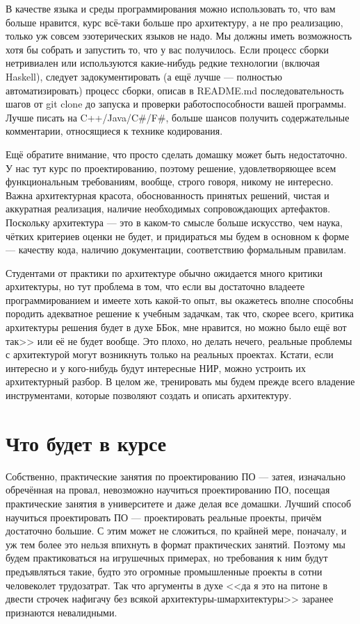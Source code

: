 \documentclass[a5paper]{article}
\begin{document}
В качестве языка и среды программирования можно использовать то, что вам больше нравится, курс всё-таки больше про архитектуру, а не про реализацию, только уж совсем эзотерических языков не надо. Мы должны иметь возможность хотя бы собрать и запустить то, что у вас получилось. Если процесс сборки нетривиален или используются какие-нибудь редкие технологии (включая Haskell), следует задокументировать (а ещё лучше --- полностью автоматизировать) процесс сборки, описав в README.md последовательность шагов от git clone до запуска и проверки работоспособности вашей программы. Лучше писать на C++/Java/C\#/F\#, больше шансов получить содержательные комментарии, относящиеся к технике кодирования.

Ещё обратите внимание, что просто сделать домашку может быть недостаточно. У нас тут курс по проектированию, поэтому решение, удовлетворяющее всем функциональным требованиям, вообще, строго говоря, никому не интересно. Важна архитектурная красота, обоснованность принятых решений, чистая и аккуратная реализация, наличие необходимых сопровождающих артефактов. Поскольку архитектура --- это в каком-то смысле больше искусство, чем наука, чётких критериев оценки не будет, и придираться мы будем в основном к форме --- качеству кода, наличию документации, соответствию формальным правилам.

Студентами от практики по архитектуре обычно ожидается много критики архитектуры, но тут проблема в том, что если вы достаточно владеете программированием и имеете хоть какой-то опыт, вы окажетесь вполне способны породить адекватное решение к учебным задачкам, так что, скорее всего, критика архитектуры решения будет в духе ББок, мне нравится, но можно было ещё вот так>> или её не будет вообще. Это плохо, но делать нечего, реальные проблемы с архитектурой могут возникнуть только на реальных проектах. Кстати, если интересно и у кого-нибудь будут интересные НИР, можно устроить их архитектурный разбор. В целом же, тренировать мы будем прежде всего владение инструментами, которые позволяют создать и описать архитектуру.

\section{Что будет в курсе}

Собственно, практические занятия по проектированию ПО --- затея, изначально обречённая на провал, невозможно научиться проектированию ПО, посещая практические занятия в университете и даже делая все домашки. Лучший способ научиться проектировать ПО --- проектировать реальные проекты, причём достаточно большие. С этим может не сложиться, по крайней мере, поначалу, и уж тем более это нельзя впихнуть в формат практических занятий. Поэтому мы будем практиковаться на игрушечных примерах, но требования к ним будут предъявляться такие, будто это огромные промышленные проекты в сотни человеколет трудозатрат. Так что аргументы в духе <<да я это на питоне в двести строчек нафигачу без всякой архитектуры-шмархитектуры>> заранее признаются невалидными. 
\end{document}
